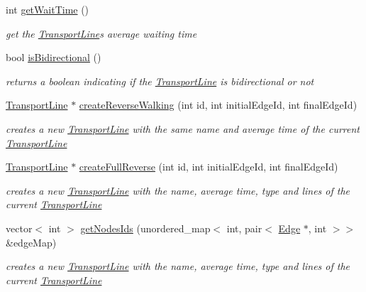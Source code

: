 \begin{DoxyCompactItemize}
int \hyperlink{class_transport_line_a789befa0e492bd2e8e7afe0b58f995b2}{get\+Wait\+Time} ()
\begin{DoxyCompactList}\small\item\em get the \hyperlink{class_transport_line}{Transport\+Line}\textquotesingle{}s average waiting time \end{DoxyCompactList}\item 
bool \hyperlink{class_transport_line_a5f521dfc4032d05538b16ce32c04d67c}{is\+Bidirectional} ()
\begin{DoxyCompactList}\small\item\em returns a boolean indicating if the \hyperlink{class_transport_line}{Transport\+Line} is bidirectional or not \end{DoxyCompactList}\item 
\hyperlink{class_transport_line}{Transport\+Line} $\ast$ \hyperlink{class_transport_line_ab89ce92ab389a171fbf85be209f24f11}{create\+Reverse\+Walking} (int id, int initial\+Edge\+Id, int final\+Edge\+Id)
\begin{DoxyCompactList}\small\item\em creates a new \hyperlink{class_transport_line}{Transport\+Line} with the same name and average time of the current \hyperlink{class_transport_line}{Transport\+Line} \end{DoxyCompactList}\item 
\hyperlink{class_transport_line}{Transport\+Line} $\ast$ \hyperlink{class_transport_line_ac326e35335fd7e50661a62511b5364f4}{create\+Full\+Reverse} (int id, int initial\+Edge\+Id, int final\+Edge\+Id)
\begin{DoxyCompactList}\small\item\em creates a new \hyperlink{class_transport_line}{Transport\+Line} with the name, average time, type and lines of the current \hyperlink{class_transport_line}{Transport\+Line} \end{DoxyCompactList}\item 
vector$<$ int $>$ \hyperlink{class_transport_line_a290cb29505345846dac71ba711e6442c}{get\+Nodes\+Ids} (unordered\+\_\+map$<$ int, pair$<$ \hyperlink{class_edge}{Edge} $\ast$, int $>$$>$ \&edge\+Map)
\begin{DoxyCompactList}\small\item\em creates a new \hyperlink{class_transport_line}{Transport\+Line} with the name, average time, type and lines of the current \hyperlink{class_transport_line}{Transport\+Line} \end{DoxyCompactList}\end{DoxyCompactItemize}
